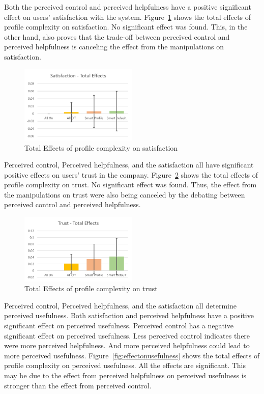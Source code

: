 Both the perceived control and perceived helpfulness have a positive significant effect on users' satisfaction with the system. Figure~\ref{fig:effectonsatisfaction} shows the total effects of profile complexity on satisfaction. No significant effect was found. This, in the other hand, also proves that the trade-off between perceived control and perceived helpfulness is canceling the effect from the manipulations on satisfaction.

\begin{figure}[ht]
	\centering
	\includegraphics[width=0.5\textwidth]{figures/effectonsatisfaction.png}
	\caption{Total Effects of profile complexity on satisfaction}
	\label{fig:effectonsatisfaction}
\end{figure}

Perceived control, Perceived helpfulness, and the satisfaction all have significant positive effects on users' trust in the company. Figure~\ref{fig:effectontrust} shows the total effects of profile complexity on trust. No significant effect was found. Thus, the effect from the manipulations on trust were also being canceled by the debating between perceived control and perceived helpfulness.

\begin{figure}[ht]
	\centering
	\includegraphics[width=0.5\textwidth]{figures/effectontrust.png}
	\caption{Total Effects of profile complexity on trust}
	\label{fig:effectontrust}
\end{figure}

Perceived control, Perceived helpfulness, and the satisfaction all determine perceived usefulness. Both satisfaction and perceived helpfulness have a positive significant effect on perceived usefulness. Perceived control has a negative significant effect on perceived usefulness. Less perceived control indicates there were more perceived helpfulness. And more perceived helpfulness could lead to more perceived usefulness. Figure~\ref{fig:effectonusefulness} shows the total effects of profile complexity on perceived usefulness. All the effects are significant. This may be due to the effect from perceived helpfulness on perceived usefulness is stronger than the effect from perceived control.

